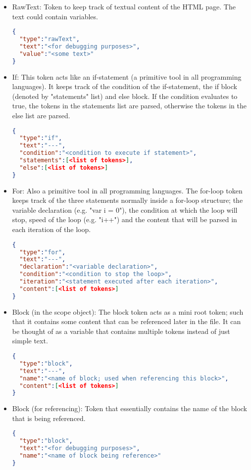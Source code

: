 \documentclass{article}
\begin{document}
\begin{itemize}
  \item RawText: Token to keep track of textual content of the HTML page. The text could contain variables.
\begin{lstlisting}[language=json,firstnumber=1]
{
  "type":"rawText",
  "text":"<for debugging purposes>",
  "value":"<some text>"
}
\end{lstlisting}

  \item If: This token acts like an if-statement (a primitive tool in all programming languages). It keeps track of the condition of the if-statement, the if block (denoted by "statements" list) and else block. If the condition evaluates to true, the tokens in the statements list are parsed, otherwise the tokens in the else list are parsed.
\begin{lstlisting}[language=json,firstnumber=1]
{
  "type":"if",
  "text":"---",
  "condition":"<condition to execute if statement>",
  "statements":[<list of tokens>],
  "else":[<list of tokens>]
}
\end{lstlisting}

  \item For: Also a primitive tool in all programming languages. The for-loop token keeps track of the three statements normally inside a for-loop structure; the variable declaration (e.g. "var i = 0"), the condition at which the loop will stop, speed of the loop (e.g. "i++") and the content that will be parsed in each iteration of the loop.
\begin{lstlisting}[language=json,firstnumber=1]
{
  "type":"for",
  "text":"---",
  "declaration":"<variable declaration>",
  "condition":"<condition to stop the loop>",
  "iteration":"<statement executed after each iteration>",
  "content":[<list of tokens>]
}
\end{lstlisting}

  \item Block (in the scope object): The block token acts as a mini root token; such that it contains some content that can be referenced later in the file. It can be thought of as a variable that contains multiple tokens instead of just simple text.
\begin{lstlisting}[language=json,firstnumber=1]
{
  "type":"block",
  "text":"---",
  "name":"<name of block; used when referencing this block>",
  "content":[<list of tokens>]
}
\end{lstlisting}

  \item Block (for referencing): Token that essentially contains the name of the block that is being referenced.
\begin{lstlisting}[language=json,firstnumber=1]
{
  "type":"block",
  "text":"<for debugging purposes>",
  "name":"<name of block being reference>"
}
\end{lstlisting}


\end{itemize}
\end{document}
